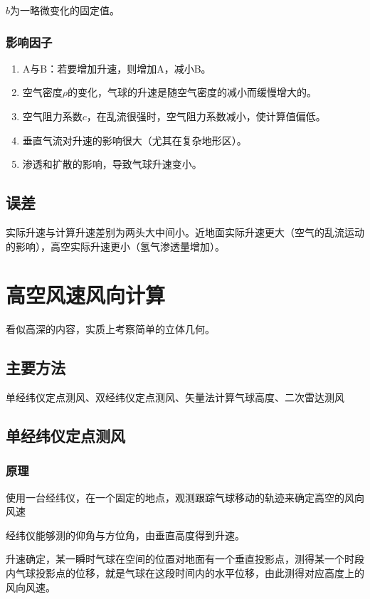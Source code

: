 \documentclass[UTF8,11pt]{ctexbook}
\begin{document}
\(b\)为一略微变化的固定值。

\subsubsection{影响因子}
\begin{enumerate}
    \item A与B：若要增加升速，则增加A，减小B。
    \item 空气密度\(\rho\)的变化，气球的升速是随空气密度的减小而缓慢增大的。
    \item 空气阻力系数\(c\)，在乱流很强时，空气阻力系数减小，使计算值偏低。
    \item 垂直气流对升速的影响很大（尤其在复杂地形区）。
    \item 渗透和扩散的影响，导致气球升速变小。
\end{enumerate}

\subsection{误差}

实际升速与计算升速差别为两头大中间小。近地面实际升速更大（空气的乱流运动的影响），高空实际升速更小（氢气渗透量增加）。

\section{高空风速风向计算}

看似高深的内容，实质上考察简单的立体几何。

\subsection{主要方法}

单经纬仪定点测风、双经纬仪定点测风、矢量法计算气球高度、二次雷达测风

\subsection{单经纬仪定点测风}

\subsubsection{原理}

使用一台经纬仪，在一个固定的地点，观测跟踪气球移动的轨迹来确定高空的风向风速

经纬仪能够测的仰角与方位角，由垂直高度得到升速。

升速确定，某一瞬时气球在空间的位置对地面有一个垂直投影点，测得某一个时段内气球投影点的位移，就是气球在这段时间内的水平位移，由此测得对应高度上的风向风速。
\end{document}
